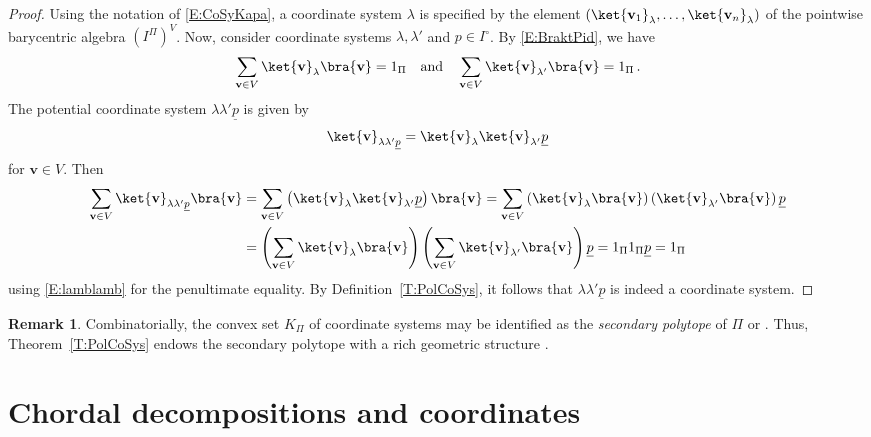 \documentclass[12pt]{amsart}
\theoremstyle{plain}
\theoremstyle{definition}
\newtheorem{remark}[theorem]{Remark}
\numberwithin{equation}{section}
\begin{document}
\begin{proof}
Using the notation of \eqref{E:CoSyKapa}, a coordinate system $\lambda$ is specified by the element $(\ket{\mathbf v_1}_\lambda,\dots,\ket{\mathbf v_n}_\lambda)$ of the pointwise barycentric algebra $(I^\Pi)^V$. Now, consider coordinate systems $\lambda,\lambda'$ and $p\in I^\circ$. By \eqref{E:BraktPid}, we have
\begin{equation}\label{E:lamblamb}
\sum_{\mathbf v\in V}\ket{\mathbf v}_{\lambda}\bra{\mathbf v}=1_\Pi
\quad
\mbox{and}
\quad
\sum_{\mathbf v\in V}\ket{\mathbf v}_{\lambda'}\bra{\mathbf v}=1_\Pi\,.
\end{equation}
The potential coordinate system $\lambda\lambda'\underline p$ is given by
$$
\ket{\mathbf v}_{\lambda\lambda'\underline p}
=\ket{\mathbf v}_{\lambda}\ket{\mathbf v}_{\lambda'}\underline p
$$
for $\mathbf{v}\in V$. Then
\begin{align*}
\sum_{\mathbf v\in V}\ket{\mathbf v}_{\lambda\lambda'\underline p}\bra{\mathbf v}
&
=
\sum_{\mathbf v\in V}\left(\ket{\mathbf v}_{\lambda}\ket{\mathbf v}_{\lambda'}\underline p
\right)\bra{\mathbf v}
=
\sum_{\mathbf v\in V}
\left(\ket{\mathbf v}_{\lambda}\bra{\mathbf v}\right)
\left(\ket{\mathbf v}_{\lambda'}\bra{\mathbf v}\right)
\underline p
\\
&
=
\left(
\sum_{\mathbf{v}\in V}\ket{\mathbf v}_{\lambda}\bra{\mathbf v}
\right)
\left(
\sum_{\mathbf{v}\in V}\ket{\mathbf v}_{\lambda'}\bra{\mathbf v}
\right)
\underline p
=1_\Pi1_\Pi\underline p
=1_\Pi
\end{align*}
using \eqref{E:lamblamb} for the penultimate equality. By Definition~\ref{T:PolCoSys}, it follows that $\lambda\lambda'\underline p$ is indeed a coordinate system.
\end{proof}


\begin{remark}\label{R:2ndaryPT}
Combinatorially, the convex set $K_\Pi$ of coordinate systems may be identified as the \emph{secondary polytope} of $\Pi$ \cite[p.7, \S5.1]{DLRS} or \cite[Ch.~7]{GelKapZel}. Thus, Theorem~\ref{T:PolCoSys} endows the secondary polytope with a rich geometric structure \cite{RJSAZD2}.
\end{remark}




\section{Chordal decompositions and coordinates}\label{S:ChDeCaCo}
\end{document}
